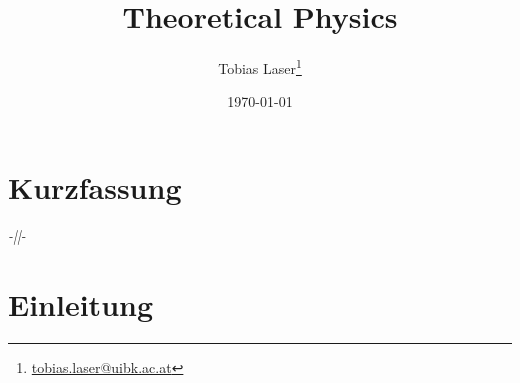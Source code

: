 \documentclass[11pt,a4paper]{scrartcl}
\begin{document}
%
\title{Theoretical Physics}
\author{Tobias Laser\thanks{\href{mailto:tobias.laser@uibk.ac.at}{tobias.laser@uibk.ac.at}}}
\date{\today}
\maketitle
\vfill
\renewcommand\abstractname{Kurzfassung}
\section*{\abstractname}
\textit{-||-}
\thispagestyle{empty}
%
%
\tableofcontents
\thispagestyle{empty}
\cleardoublepage
{} 
\newpage
%
%
\section{Einleitung}
\end{document}
